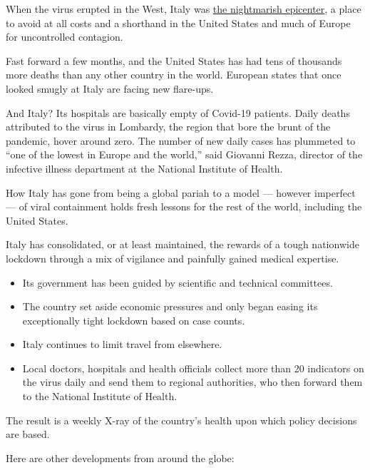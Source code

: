 When the virus erupted in the West, Italy was
\href{https://www.nytimes.com/interactive/2020/03/27/world/europe/coronavirus-italy-bergamo.html}{the
nightmarish epicenter}, a place to avoid at all costs and a shorthand in
the United States and much of Europe for uncontrolled contagion.

Fast forward a few months, and the United States has had tens of
thousands more deaths than any other country in the world. European
states that once looked smugly at Italy are facing new flare-ups.

And Italy? Its hospitals are basically empty of Covid-19 patients. Daily
deaths attributed to the virus in Lombardy, the region that bore the
brunt of the pandemic, hover around zero. The number of new daily cases
has plummeted to ``one of the lowest in Europe and the world,'' said
Giovanni Rezza, director of the infective illness department at the
National Institute of Health.

How Italy has gone from being a global pariah to a model --- however
imperfect --- of viral containment holds fresh lessons for the rest of
the world, including the United States.

Italy has consolidated, or at least maintained, the rewards of a tough
nationwide lockdown through a mix of vigilance and painfully gained
medical expertise.

\begin{itemize}
\item
  Its government has been guided by scientific and technical committees.
\item
  The country set aside economic pressures and only began easing its
  exceptionally tight lockdown based on case counts.
\item
  Italy continues to limit travel from elsewhere.
\item
  Local doctors, hospitals and health officials collect more than 20
  indicators on the virus daily and send them to regional authorities,
  who then forward them to the National Institute of Health.
\end{itemize}

The result is a weekly X-ray of the country's health upon which policy
decisions are based.

Here are other developments from around the globe:

